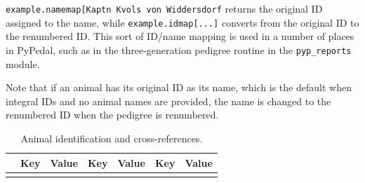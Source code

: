 \documentclass[
  letterpaper,
  DIV=11,
  numbers=noendperiod]{scrreprt}
\begin{document}
\texttt{example.namemap{[}\textquotesingle{}Kaptn\ Kvols\ von\ Widdersdorf\textquotesingle{}{]}}
returns the original ID assigned to the name, while
\texttt{example.idmap{[}...{]}} converts from the original ID to the
renumbered ID. This sort of ID/name mapping is used in a number of
places in PyPedal, such as in the three-generation pedigree routine in
the \texttt{pyp\_reports} module.

Note that if an animal has its original ID as its name, which is the
default when integral IDs and no animal names are provided, the name is
changed to the renumbered ID when the pedigree is renumbered.

\begin{longtable}[]{@{}
  >{\raggedright\arraybackslash}p{}
  >{\raggedright\arraybackslash}p{}
  >{\raggedright\arraybackslash}p{}
  >{\raggedright\arraybackslash}p{}
  >{\raggedright\arraybackslash}p{}
  >{\raggedright\arraybackslash}p{}
  >{\raggedright\arraybackslash}p{}@{}}
\caption{Animal identification and
cross-references.}\label{tbl-methodology-id-mapping}\tabularnewline
\toprule\noalign{}
\begin{minipage}[b]{\linewidth}\raggedright
\end{minipage} & \begin{minipage}[b]{\linewidth}\raggedright
Key
\end{minipage} & \begin{minipage}[b]{\linewidth}\raggedright
Value
\end{minipage} & \begin{minipage}[b]{\linewidth}\raggedright
Key
\end{minipage} & \begin{minipage}[b]{\linewidth}\raggedright
Value
\end{minipage} & \begin{minipage}[b]{\linewidth}\raggedright
Key
\end{minipage} & \begin{minipage}[b]{\linewidth}\raggedright
Value
\end{minipage} \\
\midrule\noalign{}
\endfirsthead
\toprule\noalign{}
\begin{minipage}[b]{\linewidth}\raggedright

\end{minipage}
\end{longtable}
\end{document}
